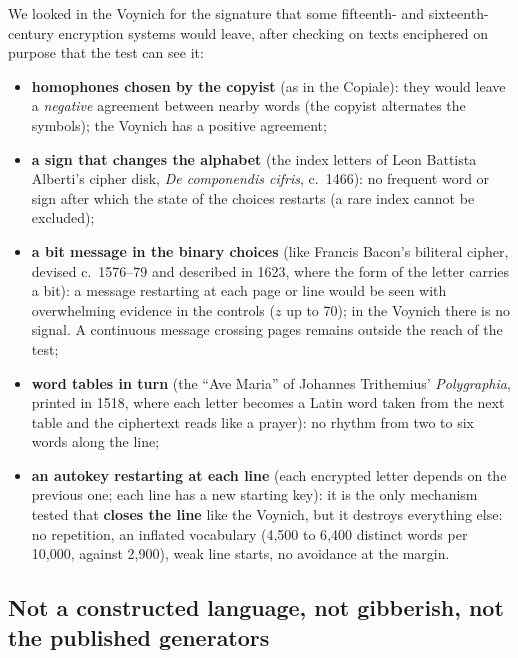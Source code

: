 We looked in the Voynich for the signature that some fifteenth- and sixteenth-century encryption systems would leave,
after checking on texts enciphered on purpose that the test can see it:
\begin{itemize}
\item \textbf{homophones chosen by the copyist} (as in the Copiale): they would leave a \emph{negative} agreement between
  nearby words (the copyist alternates the symbols); the Voynich has a positive agreement;
\item \textbf{a sign that changes the alphabet} (the index letters of Leon Battista Alberti's cipher disk, \emph{De
  componendis cifris}, c.~1466): no frequent word or sign after which the state of the choices restarts (a rare index
  cannot be excluded);
\item \textbf{a bit message in the binary choices} (like Francis Bacon's biliteral cipher, devised c.~1576--79 and
  described in 1623, where the form of the letter carries a bit): a message restarting at each page or line would be
  seen with overwhelming evidence in the controls ($z$ up to 70); in the Voynich there is no signal. A continuous message
  crossing pages remains outside the reach of the test;
\item \textbf{word tables in turn} (the ``Ave Maria'' of Johannes Trithemius' \emph{Polygraphia}, printed in 1518, where
  each letter becomes a Latin word taken from the next table and the ciphertext reads like a prayer): no rhythm from two
  to six words along the line;
\item \textbf{an autokey restarting at each line} (each encrypted letter depends on the previous one; each line has a new
  starting key): it is the only mechanism tested that \textbf{closes the line} like the Voynich, but it destroys
  everything else: no repetition, an inflated vocabulary (4{,}500 to 6{,}400 distinct words per 10{,}000, against 2{,}900),
  weak line starts, no avoidance at the margin.
\end{itemize}

\subsection{Not a constructed language, not gibberish, not the published generators}

